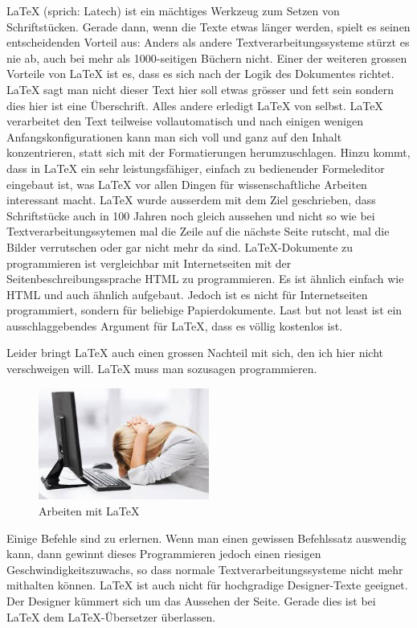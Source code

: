 LaTeX (sprich: Latech) ist ein mächtiges Werkzeug zum Setzen von Schriftstücken. Gerade dann, wenn die Texte etwas länger werden, spielt es seinen entscheidenden Vorteil aus: Anders als andere Textverarbeitungssysteme stürzt es nie ab, auch bei mehr als 1000-seitigen Büchern nicht. Einer der weiteren grossen Vorteile von LaTeX ist es, dass es sich nach der Logik des Dokumentes richtet. LaTeX sagt man nicht \dq dieser Text hier soll etwas grösser und fett sein\dq{} sondern \dq dies hier ist eine Überschrift\dq. Alles andere erledigt LaTeX von selbst. LaTeX verarbeitet den Text teilweise vollautomatisch und nach einigen wenigen Anfangskonfigurationen kann man sich voll und ganz auf den Inhalt konzentrieren, statt sich mit der Formatierungen herumzuschlagen. Hinzu kommt, dass in LaTeX ein sehr leistungsfähiger, einfach zu bedienender Formeleditor eingebaut ist, was LaTeX vor allen Dingen für wissenschaftliche Arbeiten interessant macht. LaTeX wurde ausserdem mit dem Ziel geschrieben, dass Schriftstücke auch in 100 Jahren noch gleich aussehen und nicht so wie bei Textverarbeitungssytemen mal die Zeile auf die nächste Seite rutscht, mal die Bilder verrutschen oder gar nicht mehr da sind. LaTeX-Dokumente zu \dq programmieren\dq{} ist vergleichbar mit Internetseiten mit der Seitenbeschreibungssprache HTML zu programmieren. Es ist ähnlich einfach wie HTML und auch ähnlich aufgebaut. Jedoch ist es nicht für Internetseiten programmiert, sondern für beliebige Papierdokumente. Last but not least ist ein ausschlaggebendes Argument für LaTeX, dass es völlig kostenlos ist. 

Leider bringt LaTeX auch einen grossen Nachteil mit sich, den ich hier nicht verschweigen will. LaTeX muss man sozusagen \dq programmieren\dq. 

\begin{figure}[h!]
\centering
  \includegraphics[width=0.5\textwidth]{./Bilder/LaTeX_Anwender.jpg}
  \caption{Arbeiten mit \LaTeX}
\end{figure}

Einige Befehle sind zu erlernen. Wenn man einen gewissen Befehlssatz auswendig kann, dann gewinnt dieses \dq Programmieren\dq{} jedoch einen riesigen Geschwindigkeitszuwachs, so dass \dq normale \dq{} Text\-ver\-ar\-beit\-ungs\-systeme nicht mehr mithalten können. LaTeX ist auch nicht für hochgradige Designer-Texte geeignet. Der Designer kümmert sich um das Aussehen der Seite. Gerade dies ist bei LaTeX dem LaTeX-Übersetzer überlassen. 

